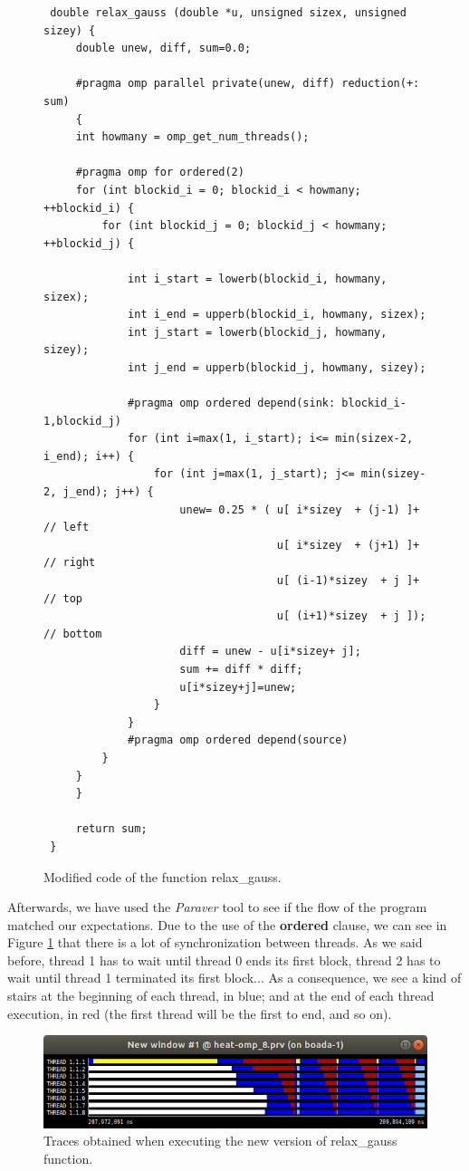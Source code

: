 \documentclass[12pt, a4paper]{article}
\begin{document}
\begin{figure}[H]
\begin{lstlisting}
 double relax_gauss (double *u, unsigned sizex, unsigned sizey) {
     double unew, diff, sum=0.0;
 
     #pragma omp parallel private(unew, diff) reduction(+: sum)
     {
	 int howmany = omp_get_num_threads();
	
	 #pragma omp for ordered(2) 
	 for (int blockid_i = 0; blockid_i < howmany; ++blockid_i) {
		 for (int blockid_j = 0; blockid_j < howmany; ++blockid_j) {
			 
			 int i_start = lowerb(blockid_i, howmany, sizex);
			 int i_end = upperb(blockid_i, howmany, sizex);
			 int j_start = lowerb(blockid_j, howmany, sizey);
			 int j_end = upperb(blockid_j, howmany, sizey);
			
			 #pragma omp ordered depend(sink: blockid_i-1,blockid_j)
			 for (int i=max(1, i_start); i<= min(sizex-2, i_end); i++) {
				 for (int j=max(1, j_start); j<= min(sizey-2, j_end); j++) {
					 unew= 0.25 * ( u[ i*sizey	+ (j-1) ]+  // left
								    u[ i*sizey	+ (j+1) ]+  // right
								    u[ (i-1)*sizey	+ j ]+  // top
								    u[ (i+1)*sizey	+ j ]); // bottom
					 diff = unew - u[i*sizey+ j];
					 sum += diff * diff; 
					 u[i*sizey+j]=unew;
				 }
			 }
			 #pragma omp ordered depend(source)
		 }
	 }
	 }
 
     return sum;
 }
\end{lstlisting}
\caption{Modified code of the function relax\_gauss.}
\end{figure}
 
Afterwards, we have used the \textit{Paraver} tool to see if the flow of the program matched our expectations. Due to the use of the \textbf{ordered} clause, we can see in Figure \ref{fig:trace-gauss-seidel-S4} that there is a lot of synchronization between threads. As we said before, thread 1 has to wait until thread 0 ends its first block, thread 2 has to wait until thread 1 terminated its first block... As a consequence, we see a kind of stairs at the beginning of each thread, in blue; and at the end of each thread execution, in red (the first thread will be the first to end, and so on).

\begin{figure}[H]
	\centering
	\includegraphics[scale=0.5]{./images/paraver-gauss}
	\caption{Traces obtained when executing the new version of relax\_gauss function.}
	\label{fig:trace-gauss-seidel-S4}
\end{figure}
\end{document}
